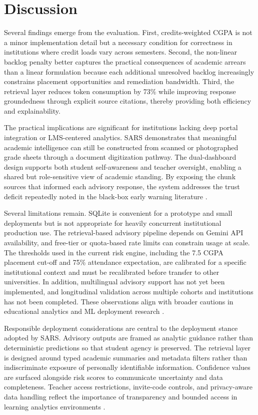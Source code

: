 \documentclass[conference]{IEEEtran}
\begin{document}
\section{Discussion}
Several findings emerge from the evaluation. First, credits-weighted CGPA is not a minor implementation detail but a necessary condition for correctness in institutions where credit loads vary across semesters. Second, the non-linear backlog penalty better captures the practical consequences of academic arrears than a linear formulation because each additional unresolved backlog increasingly constrains placement opportunities and remediation bandwidth. Third, the retrieval layer reduces token consumption by 73\% while improving response groundedness through explicit source citations, thereby providing both efficiency and explainability.

The practical implications are significant for institutions lacking deep portal integration or LMS-centered analytics. SARS demonstrates that meaningful academic intelligence can still be constructed from scanned or photographed grade sheets through a document digitization pathway. The dual-dashboard design supports both student self-awareness and teacher oversight, enabling a shared but role-sensitive view of academic standing. By exposing the chunk sources that informed each advisory response, the system addresses the trust deficit repeatedly noted in the black-box early warning literature \cite{jayaprakash2014early,khosravi2022xai,conati2018interpretable}.

Several limitations remain. SQLite is convenient for a prototype and small deployments but is not appropriate for heavily concurrent institutional production use. The retrieval-based advisory pipeline depends on Gemini API availability, and free-tier or quota-based rate limits can constrain usage at scale. The thresholds used in the current risk engine, including the 7.5 CGPA placement cut-off and 75\% attendance expectation, are calibrated for a specific institutional context and must be recalibrated before transfer to other universities. In addition, multilingual advisory support has not yet been implemented, and longitudinal validation across multiple cohorts and institutions has not been completed. These observations align with broader cautions in educational analytics and ML deployment research \cite{hussain2019predicting,summers2021predicting}.

Responsible deployment considerations are central to the deployment stance adopted by SARS. Advisory outputs are framed as analytic guidance rather than deterministic predictions so that student agency is preserved. The retrieval layer is designed around typed academic summaries and metadata filters rather than indiscriminate exposure of personally identifiable information. Confidence values are surfaced alongside risk scores to communicate uncertainty and data completeness. Teacher access restrictions, invite-code controls, and privacy-aware data handling reflect the importance of transparency and bounded access in learning analytics environments \cite{ifenthaler2016privacy,khosravi2022xai}.
\end{document}
